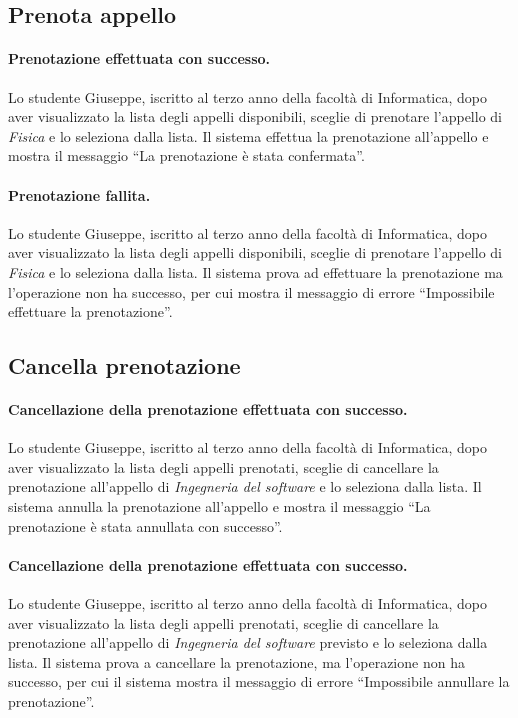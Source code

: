 
\subsection{Prenota appello}
\paragraph{Prenotazione effettuata con successo.}
Lo studente Giuseppe, iscritto al terzo anno della facoltà di Informatica, dopo aver visualizzato la lista degli appelli disponibili, sceglie di prenotare l’appello di \textit{Fisica} e lo seleziona dalla lista. Il sistema effettua la prenotazione all’appello e mostra il messaggio “La prenotazione è stata confermata”.

\paragraph{Prenotazione fallita.}
Lo studente Giuseppe, iscritto al terzo anno della facoltà di Informatica, dopo aver visualizzato la lista degli appelli disponibili, sceglie di prenotare l’appello di \textit{Fisica} e lo seleziona dalla lista. Il sistema prova ad effettuare la prenotazione ma l’operazione non ha successo, per cui mostra il messaggio di errore “Impossibile effettuare la prenotazione”.


\subsection{Cancella prenotazione}
\paragraph{Cancellazione della prenotazione effettuata con successo.}
Lo studente Giuseppe, iscritto al terzo anno della facoltà di Informatica, dopo aver visualizzato la lista degli appelli prenotati, sceglie di cancellare la prenotazione all’appello di \textit{Ingegneria del software} e lo seleziona dalla lista. Il sistema annulla la prenotazione all’appello e mostra il messaggio “La prenotazione è stata annullata con successo”.

\paragraph{Cancellazione della prenotazione effettuata con successo.}
Lo studente Giuseppe, iscritto al terzo anno della facoltà di Informatica, dopo aver visualizzato la lista degli appelli prenotati, sceglie di cancellare la prenotazione all’appello di \textit{Ingegneria del software} previsto e lo seleziona dalla lista. Il sistema prova a cancellare la prenotazione, ma l’operazione non ha successo, per cui il sistema mostra il messaggio di errore “Impossibile annullare la prenotazione”.

